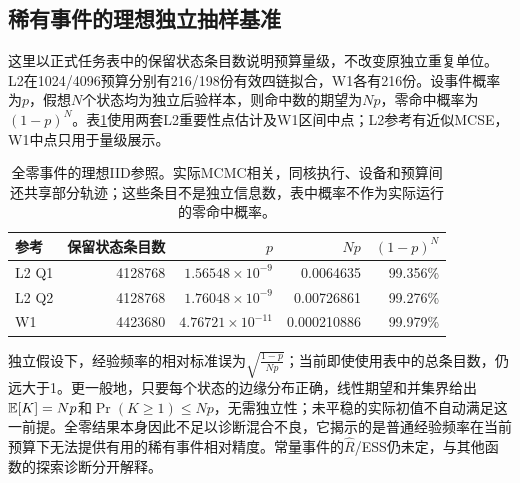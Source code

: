 \subsection{稀有事件的理想独立抽样基准}
\label{sec:rare-iid}
这里以正式任务表中的保留状态条目数说明预算量级，不改变原独立重复单位。L2在1024/4096预算分别有216/198份有效四链拟合，W1各有216份。设事件概率为$p$，假想$N$个状态均为独立后验样本，则命中数的期望为$Np$，零命中概率为$(1-p)^N$。表\ref{tab:rare-iid}使用两套L2重要性点估计及W1区间中点；L2参考有近似MCSE，W1中点只用于量级展示。
\begin{table}[htbp]\centering\small
\begin{tabular}{lrrrr}\toprule
参考 & 保留状态条目数 & $p$ & $Np$ & $(1-p)^N$\\\midrule
L2 Q1 & 4128768 & $1.56548\times10^{-9}$ & 0.0064635 & 99.356\%\\
L2 Q2 & 4128768 & $1.76048\times10^{-9}$ & 0.00726861 & 99.276\%\\
W1 & 4423680 & $4.76721\times10^{-11}$ & 0.000210886 & 99.979\%\\
\bottomrule\end{tabular}
\caption{全零事件的理想IID参照。实际MCMC相关，同核执行、设备和预算间还共享部分轨迹；这些条目不是独立信息数，表中概率不作为实际运行的零命中概率。}
\label{tab:rare-iid}\end{table}
\FloatBarrier
独立假设下，经验频率的相对标准误为$\sqrt{\frac{1-p}{Np}}$；当前即使使用表中的总条目数，仍远大于1。更一般地，只要每个状态的边缘分布正确，线性期望和并集界给出$\mathbb{E}[K]=Np$和$\Pr(K\geq1)\leq Np$，无需独立性；未平稳的实际初值不自动满足这一前提。全零结果本身因此不足以诊断混合不良，它揭示的是普通经验频率在当前预算下无法提供有用的稀有事件相对精度。常量事件的$\hat R$/ESS仍未定，与其他函数的探索诊断分开解释。

